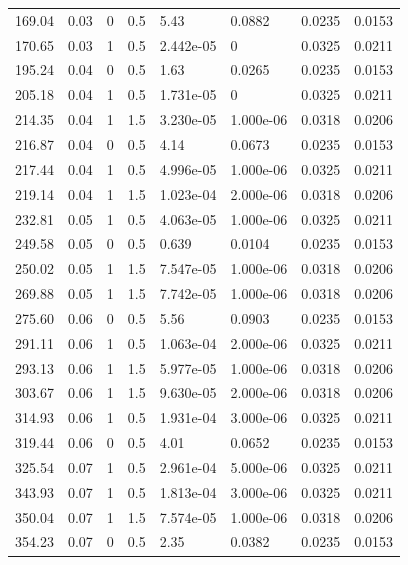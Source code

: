 \documentclass[preview]{standalone}
\begin{document}
{{\begin{tabular}{L{1.2cm}C{1.2cm} C{0.3cm}C{0.5cm} C{1.4cm}C{1.4cm} C{1.4cm}C{1.4cm}}
  169.04  &  0.03  & 0     & 0.5 &  5.43  & 0.0882  & 0.0235 &  0.0153   \\ 
  170.65  &  0.03  & 1     & 0.5 &  2.442e-05  & 0  & 0.0325 &  0.0211   \\ 
  195.24  &  0.04  & 0     & 0.5 &  1.63  & 0.0265  & 0.0235 &  0.0153   \\ 
  205.18  &  0.04  & 1     & 0.5 &  1.731e-05  & 0  & 0.0325 &  0.0211   \\ 
  214.35  &  0.04  & 1     & 1.5 &  3.230e-05  & 1.000e-06  & 0.0318 &  0.0206   \\ 
  216.87  &  0.04  & 0     & 0.5 &  4.14  & 0.0673  & 0.0235 &  0.0153   \\ 
  217.44  &  0.04  & 1     & 0.5 &  4.996e-05  & 1.000e-06  & 0.0325 &  0.0211   \\ 
  219.14  &  0.04  & 1     & 1.5 &  1.023e-04  & 2.000e-06  & 0.0318 &  0.0206   \\ 
  232.81  &  0.05  & 1     & 0.5 &  4.063e-05  & 1.000e-06  & 0.0325 &  0.0211   \\ 
  249.58  &  0.05  & 0     & 0.5 &  0.639  & 0.0104  & 0.0235 &  0.0153   \\ 
  250.02  &  0.05  & 1     & 1.5 &  7.547e-05  & 1.000e-06  & 0.0318 &  0.0206   \\ 
  269.88  &  0.05  & 1     & 1.5 &  7.742e-05  & 1.000e-06  & 0.0318 &  0.0206   \\ 
  275.60  &  0.06  & 0     & 0.5 &  5.56  & 0.0903  & 0.0235 &  0.0153   \\ 
  291.11  &  0.06  & 1     & 0.5 &  1.063e-04  & 2.000e-06  & 0.0325 &  0.0211   \\ 
  293.13  &  0.06  & 1     & 1.5 &  5.977e-05  & 1.000e-06  & 0.0318 &  0.0206   \\ 
  303.67  &  0.06  & 1     & 1.5 &  9.630e-05  & 2.000e-06  & 0.0318 &  0.0206   \\ 
  314.93  &  0.06  & 1     & 0.5 &  1.931e-04  & 3.000e-06  & 0.0325 &  0.0211   \\ 
  319.44  &  0.06  & 0     & 0.5 &  4.01  & 0.0652  & 0.0235 &  0.0153   \\ 
  325.54  &  0.07  & 1     & 0.5 &  2.961e-04  & 5.000e-06  & 0.0325 &  0.0211   \\ 
  343.93  &  0.07  & 1     & 0.5 &  1.813e-04  & 3.000e-06  & 0.0325 &  0.0211   \\ 
  350.04  &  0.07  & 1     & 1.5 &  7.574e-05  & 1.000e-06  & 0.0318 &  0.0206   \\ 
  354.23  &  0.07  & 0     & 0.5 &  2.35  & 0.0382  & 0.0235 &  0.0153   \\ 

\end{tabular}}}
\end{document}

